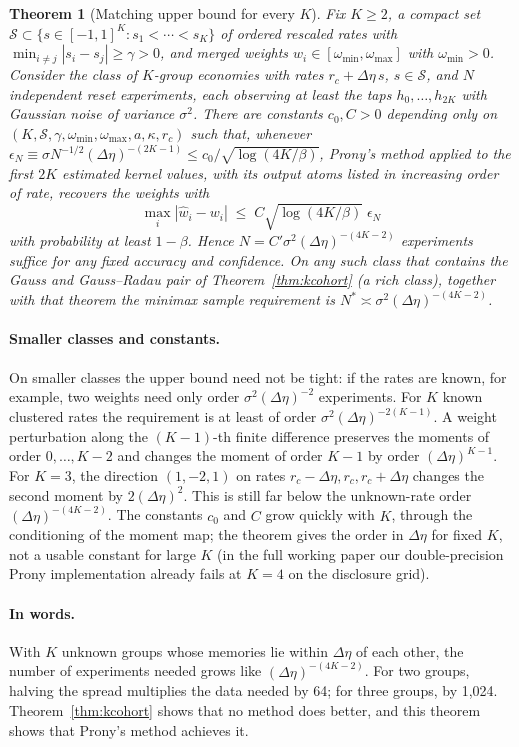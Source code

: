 \documentclass[12pt]{article}
\newtheorem{theorem}{Theorem}[section]
\theoremstyle{definition}
\theoremstyle{remark}
\begin{document}
\begin{theorem}[Matching upper bound for every $K$]\label{prop:esprit}
Fix $K\ge2$, a compact set $\mathcal S\subset\{s\in[-1,1]^K:s_1<\cdots<s_K\}$ of ordered rescaled rates with $\min_{i\ne j}|s_i-s_j|\ge\gamma>0$, and merged weights $w_i\in[\omega_{\min},\omega_{\max}]$ with $\omega_{\min}>0$. Consider the class of $K$-group economies with rates $r_c+\Delta\eta\,s$, $s\in\mathcal S$, and $N$ independent reset experiments, each observing at least the taps $h_0,\ldots,h_{2K}$ with Gaussian noise of variance $\sigma^2$. There are constants $c_0,C>0$ depending only on $(K,\mathcal S,\gamma,\omega_{\min},\omega_{\max},a,\kappa,r_c)$ such that, whenever $\epsilon_N\equiv\sigma N^{-1/2}(\Delta\eta)^{-(2K-1)}\le c_0/\sqrt{\log(4K/\beta)}$, Prony's method applied to the first $2K$ estimated kernel values, with its output atoms listed in increasing order of rate, recovers the weights with
\[
\max_i|\hat w_i-w_i|\;\le\;C\sqrt{\log(4K/\beta)}\;\epsilon_N
\]
with probability at least $1-\beta$. Hence $N=C'\sigma^2(\Delta\eta)^{-(4K-2)}$ experiments suffice for any fixed accuracy and confidence. On any such class that contains the Gauss and Gauss--Radau pair of Theorem~\ref{thm:kcohort} (a rich class), together with that theorem the minimax sample requirement is $N^*\asymp\sigma^2(\Delta\eta)^{-(4K-2)}$.
\end{theorem}

\paragraph{Smaller classes and constants.} On smaller classes the upper bound need not be tight: if the rates are known, for example, two weights need only order $\sigma^2(\Delta\eta)^{-2}$ experiments. For $K$ known clustered rates the requirement is at least of order $\sigma^2(\Delta\eta)^{-2(K-1)}$. A weight perturbation along the $(K-1)$-th finite difference preserves the moments of order $0,\ldots,K-2$ and changes the moment of order $K-1$ by order $(\Delta\eta)^{K-1}$. For $K=3$, the direction $(1,-2,1)$ on rates $r_c-\Delta\eta,r_c,r_c+\Delta\eta$ changes the second moment by $2(\Delta\eta)^2$. This is still far below the unknown-rate order $(\Delta\eta)^{-(4K-2)}$. The constants $c_0$ and $C$ grow quickly with $K$, through the conditioning of the moment map; the theorem gives the order in $\Delta\eta$ for fixed $K$, not a usable constant for large $K$ (in the full working paper our double-precision Prony implementation already fails at $K=4$ on the disclosure grid).
\paragraph{In words.} With $K$ unknown groups whose memories lie within $\Delta\eta$ of each other, the number of experiments needed grows like $(\Delta\eta)^{-(4K-2)}$. For two groups, halving the spread multiplies the data needed by 64; for three groups, by 1{,}024. Theorem~\ref{thm:kcohort} shows that no method does better, and this theorem shows that Prony's method achieves it.
\end{document}
